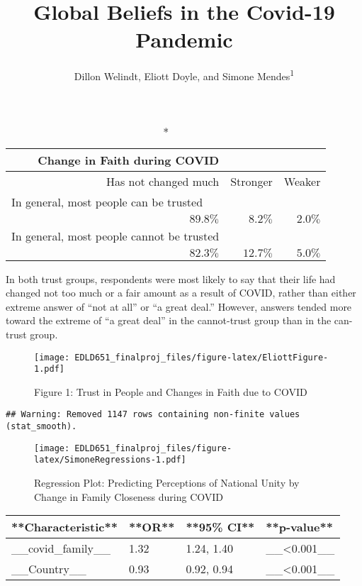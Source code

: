 \documentclass[
  english,
  man]{apa6}
\title{Global Beliefs in the Covid-19 Pandemic}
\author{Dillon Welindt, Eliott Doyle, and Simone Mendes\textsuperscript{1}}
\date{}
\affiliation{\vspace{0.5cm}\textsuperscript{1} University of Oregon}
\begin{document}
\maketitle

\captionsetup[table]{labelformat=empty,skip=1pt}
\begin{longtable}{rrr}
\caption*{
{\large Change in Faith during COVID}
} \\ 
\toprule
Has not changed much & Stronger & Weaker \\ 
\midrule
\multicolumn{1}{l}{In general, most people can be trusted} \\ 
\midrule
$89.8\%$ & $8.2\%$ & $2.0\%$ \\ 
\midrule
\multicolumn{1}{l}{In general, most people cannot be trusted} \\ 
$82.3\%$ & $12.7\%$ & $5.0\%$ \\ 
 \bottomrule
\end{longtable}

In both trust groups, respondents were most likely to say that their life had changed not too much or a fair amount as a result of COVID, rather than either extreme answer of \enquote{not at all} or \enquote{a great deal.} However, answers tended more toward the extreme of \enquote{a great deal} in the cannot-trust group than in the can-trust group.

\begin{figure}
\centering
\texttt{[image: EDLD651\_finalproj\_files/figure-latex/EliottFigure-1.pdf]}
\caption{\label{fig:EliottFigure}Figure 1: Trust in People and Changes in Faith due to COVID}
\end{figure}

\begin{verbatim}
## Warning: Removed 1147 rows containing non-finite values (stat_smooth).
\end{verbatim}

\begin{figure}
\centering
\texttt{[image: EDLD651\_finalproj\_files/figure-latex/SimoneRegressions-1.pdf]}
\caption{\label{fig:SimoneRegressions}Regression Plot: Predicting Perceptions of National Unity by Change in Family Closeness during COVID}
\end{figure}

\begin{tabular}{l|l|l|l}
\hline
**Characteristic** & **OR** & **95\% CI** & **p-value**\\
\hline
\_\_covid\_family\_\_ & 1.32 & 1.24, 1.40 & \_\_<0.001\_\_\\
\hline
\_\_Country\_\_ & 0.93 & 0.92, 0.94 & \_\_<0.001\_\_\\
\hline
\end{tabular}
\end{document}
